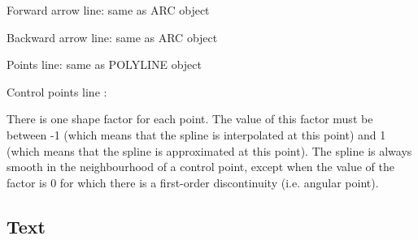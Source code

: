\documentclass[10pt, a4paper]{article}
\begin{document}
    Forward arrow line: same as ARC object

    Backward arrow line: same as ARC object

    Points line: same as POLYLINE object

    Control points line :

    There is one shape factor for each point. The value of this factor
    must be between -1 (which means that the spline is interpolated at
    this point) and 1 (which means that the spline is approximated at
    this point). The spline is always smooth in the neighbourhood of a
    control point, except when the value of     the factor is 0 for which
    there is a first-order discontinuity (i.e. angular point).


\subsection{Text}\label{subsec:text}
\end{document}
